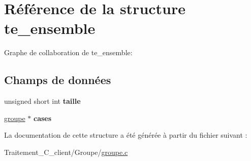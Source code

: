 \hypertarget{structte__ensemble}{}\section{Référence de la structure te\+\_\+ensemble}
\label{structte__ensemble}


Graphe de collaboration de te\+\_\+ensemble\+:
\subsection*{Champs de données}
\begin{DoxyCompactItemize}
\item 
unsigned short int {\bfseries taille}\hypertarget{structte__ensemble_a87635cc952ac19449af46738bb99fbc0}{}\label{structte__ensemble_a87635cc952ac19449af46738bb99fbc0}

\item 
\hyperlink{groupe_8h_af0a904698ccc1020e44b1b2afc0e790c}{groupe} $\ast$ {\bfseries cases}\hypertarget{structte__ensemble_af27395c49fadab8fc66f285e62b3f503}{}\label{structte__ensemble_af27395c49fadab8fc66f285e62b3f503}

\end{DoxyCompactItemize}


La documentation de cette structure a été générée à partir du fichier suivant \+:\begin{DoxyCompactItemize}
\item 
Traitement\+\_\+\+C\+\_\+client/\+Groupe/\hyperlink{groupe_8c}{groupe.\+c}\end{DoxyCompactItemize}
